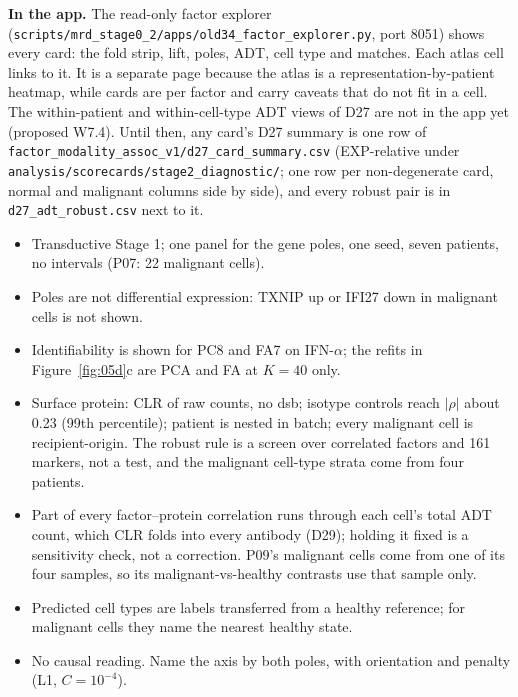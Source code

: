 {\sloppy \textbf{In the app.} The read-only factor explorer (\texttt{scripts/\allowbreak mrd\_stage0\_2/\allowbreak apps/\allowbreak old34\_factor\_\allowbreak explorer.py}, port 8051) shows every card: the fold strip, lift, poles, ADT, cell type and matches. Each atlas cell links to it. It is a separate page because the atlas is a representation-by-patient heatmap, while cards are per factor and carry caveats that do not fit in a cell. The within-patient and within-cell-type ADT views of D27 are not in the app yet (proposed W7.4). Until then, any card's D27 summary is one row of \texttt{factor\_modality\_assoc\_v1/\allowbreak d27\_card\_summary.csv} (EXP-relative under \texttt{analysis/\allowbreak scorecards/\allowbreak stage2\_diagnostic/}; one row per non-degenerate card, normal and malignant columns side by side), and every robust pair is in \texttt{d27\_adt\_robust.csv} next to it.\par}

\begin{caveatbox}
\begin{itemize}[leftmargin=*,itemsep=0pt,topsep=0pt]
\item Transductive Stage 1; one panel for the gene poles, one seed, seven patients, no intervals (P07: 22 malignant cells).
\item Poles are not differential expression: TXNIP up or IFI27 down in malignant cells is not shown.
\item Identifiability is shown for PC8 and FA7 on IFN-$\alpha$; the refits in Figure~\ref{fig:05d}c are PCA and FA at $K = 40$ only.
\item Surface protein: CLR of raw counts, no dsb; isotype controls reach $|\rho|$ about 0.23 (99th percentile); patient is nested in batch; every malignant cell is recipient-origin. The robust rule is a screen over correlated factors and 161 markers, not a test, and the malignant cell-type strata come from four patients.
\item Part of every factor--protein correlation runs through each cell's total ADT count, which CLR folds into every antibody (D29); holding it fixed is a sensitivity check, not a correction. P09's malignant cells come from one of its four samples, so its malignant-vs-healthy contrasts use that sample only.
\item Predicted cell types are labels transferred from a healthy reference; for malignant cells they name the nearest healthy state.
\item No causal reading. Name the axis by both poles, with orientation and penalty (L1, $C=10^{-4}$).
\end{itemize}
\end{caveatbox}

